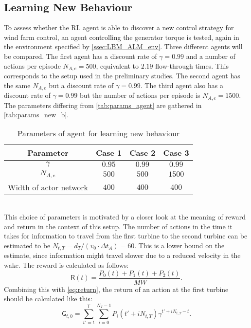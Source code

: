 \subsection{Learning New Behaviour}
\label{ssec:new_behaviour_description}
To assess whether the RL agent is able to discover a new control strategy for wind farm control, an agent controlling the generator torque is tested, again in the environment specified by \autoref{ssec:LBM_ALM_env}. Three different agents will be compared. The first agent has a discount rate of $\gamma = 0.99$ and a number of actions per episode $N_{A,e} = 500$, equivalent to $2.19$ flow-through times. This corresponds to the setup used in the preliminary studies. The second agent has the same $N_{A,e}$ but a discount rate of $\gamma = 0.99$. The third agent also has a discount rate of $\gamma = 0.99$ but the number of actions per episode is $N_{A,e} = 1500$. The parameters differing from \autoref{tab:params_agent} are gathered in \autoref{tab:params_new_b}. 
\begin{table}[h]
	\centering
	\caption{Parameters of agent for learning new behaviour}
	\begin{tabular}{cccc}
		\toprule 
		Parameter & Case 1 & Case 2 & Case 3 \\ 
		\midrule
		$\gamma$ & $0.95$ & $0.99$ & $0.99$ \\ 
		$N_{A,e}$ & $500$ & $500$ & $1500$ \\ 
		Width of actor network & $400$ & $400$ & $400$ \\
		\bottomrule
	\end{tabular}
	\label{tab:params_new_b}
\end{table}\\
This choice of parameters is motivated by a closer look at the meaning of reward and return in the context of this setup. The number of actions in the time it takes for information to travel from the first turbine to the second turbine can be estimated to be $N_{t,T} = d_T/(v_0 \cdot \Delta t_A) = 60$. This is a lower bound on the estimate, since information might travel slower due to a reduced velocity in the wake. The reward is calculated as follows: 
\begin{equation} 
\mathsf{R}(t) = \frac{P_0(t) + P_1(t) + P_2(t)}{\SI{}{MW}}.
\end{equation} Combining this with \eqref{eq:return}, the return of an action at the first turbine should be calculated like this:
\begin{equation}
	\mathsf{G}_{t,0} = \sum^\mathsf{T}_{t'=t} \sum_{i=0}^{N_T-1}P_i(t'+iN_{t,T})\gamma^{t'+iN_{t,T}-t}.
\end{equation}
